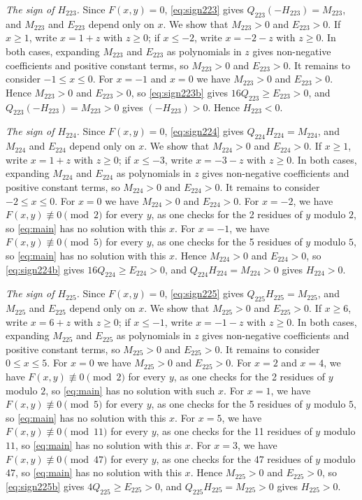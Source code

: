 \documentclass[11pt]{article}
\begin{document}
\emph{The sign of $H_{223}$.} Since $F(x,y)=0$, \eqref{eq:sign223} gives $Q_{223}(-H_{223})=M_{223}$, and $M_{223}$ and $E_{223}$ depend only on $x$. We show that $M_{223}>0$ and $E_{223}>0$. If $x\geq1$, write $x=1+z$ with $z\geq0$; if $x\leq-2$, write $x=-2-z$ with $z\geq0$. In both cases, expanding $M_{223}$ and $E_{223}$ as polynomials in $z$ gives non-negative coefficients and positive constant terms, so $M_{223}>0$ and $E_{223}>0$. It remains to consider $-1\leq x\leq0$. For $x=-1$ and $x=0$ we have $M_{223}>0$ and $E_{223}>0$. Hence $M_{223}>0$ and $E_{223}>0$, so \eqref{eq:sign223b} gives $16Q_{223}\geq E_{223}>0$, and $Q_{223}(-H_{223})=M_{223}>0$ gives $(-H_{223})>0$. Hence $H_{223}<0$.

\emph{The sign of $H_{224}$.} Since $F(x,y)=0$, \eqref{eq:sign224} gives $Q_{224}H_{224}=M_{224}$, and $M_{224}$ and $E_{224}$ depend only on $x$. We show that $M_{224}>0$ and $E_{224}>0$. If $x\geq1$, write $x=1+z$ with $z\geq0$; if $x\leq-3$, write $x=-3-z$ with $z\geq0$. In both cases, expanding $M_{224}$ and $E_{224}$ as polynomials in $z$ gives non-negative coefficients and positive constant terms, so $M_{224}>0$ and $E_{224}>0$. It remains to consider $-2\leq x\leq0$. For $x=0$ we have $M_{224}>0$ and $E_{224}>0$. For $x=-2$, we have $F(x,y)\not\equiv0\pmod{2}$ for every $y$, as one checks for the 2 residues of $y$ modulo $2$, so \eqref{eq:main} has no solution with this $x$. For $x=-1$, we have $F(x,y)\not\equiv0\pmod{5}$ for every $y$, as one checks for the 5 residues of $y$ modulo $5$, so \eqref{eq:main} has no solution with this $x$. Hence $M_{224}>0$ and $E_{224}>0$, so \eqref{eq:sign224b} gives $16Q_{224}\geq E_{224}>0$, and $Q_{224}H_{224}=M_{224}>0$ gives $H_{224}>0$.

\emph{The sign of $H_{225}$.} Since $F(x,y)=0$, \eqref{eq:sign225} gives $Q_{225}H_{225}=M_{225}$, and $M_{225}$ and $E_{225}$ depend only on $x$. We show that $M_{225}>0$ and $E_{225}>0$. If $x\geq6$, write $x=6+z$ with $z\geq0$; if $x\leq-1$, write $x=-1-z$ with $z\geq0$. In both cases, expanding $M_{225}$ and $E_{225}$ as polynomials in $z$ gives non-negative coefficients and positive constant terms, so $M_{225}>0$ and $E_{225}>0$. It remains to consider $0\leq x\leq5$. For $x=0$ we have $M_{225}>0$ and $E_{225}>0$. For $x=2$ and $x=4$, we have $F(x,y)\not\equiv0\pmod{2}$ for every $y$, as one checks for the 2 residues of $y$ modulo $2$, so \eqref{eq:main} has no solution with such $x$. For $x=1$, we have $F(x,y)\not\equiv0\pmod{5}$ for every $y$, as one checks for the 5 residues of $y$ modulo $5$, so \eqref{eq:main} has no solution with this $x$. For $x=5$, we have $F(x,y)\not\equiv0\pmod{11}$ for every $y$, as one checks for the 11 residues of $y$ modulo $11$, so \eqref{eq:main} has no solution with this $x$. For $x=3$, we have $F(x,y)\not\equiv0\pmod{47}$ for every $y$, as one checks for the 47 residues of $y$ modulo $47$, so \eqref{eq:main} has no solution with this $x$. Hence $M_{225}>0$ and $E_{225}>0$, so \eqref{eq:sign225b} gives $4Q_{225}\geq E_{225}>0$, and $Q_{225}H_{225}=M_{225}>0$ gives $H_{225}>0$.
\end{document}
